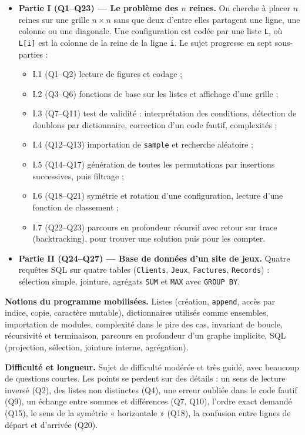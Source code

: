 \documentclass[11pt,a4paper]{article}
\providecommand{\tightlist}{\setlength{\itemsep}{0pt}\setlength{\parskip}{0pt}}
\begin{document}
\begin{itemize}
\tightlist
\item
  \textbf{Partie I (Q1--Q23) --- Le problème des \(n\) reines.} On cherche à placer \(n\) reines sur une grille \(n \times n\) sans que deux d'entre elles partagent une ligne, une colonne ou une diagonale. Une configuration est codée par une liste \texttt{L}, où \texttt{L{[}i{]}} est la colonne de la reine de la ligne \texttt{i}. Le sujet progresse en sept sous-parties :

  \begin{itemize}
  \tightlist
  \item
    I.1 (Q1--Q2) lecture de figures et codage ;
  \item
    I.2 (Q3--Q6) fonctions de base sur les listes et affichage d'une grille ;
  \item
    I.3 (Q7--Q11) test de validité : interprétation des conditions, détection de doublons par dictionnaire, correction d'un code fautif, complexités ;
  \item
    I.4 (Q12--Q13) importation de \texttt{sample} et recherche aléatoire ;
  \item
    I.5 (Q14--Q17) génération de toutes les permutations par insertions successives, puis filtrage ;
  \item
    I.6 (Q18--Q21) symétrie et rotation d'une configuration, lecture d'une fonction de classement ;
  \item
    I.7 (Q22--Q23) parcours en profondeur récursif avec retour sur trace (backtracking), pour trouver une solution puis pour les compter.
  \end{itemize}
\item
  \textbf{Partie II (Q24--Q27) --- Base de données d'un site de jeux.} Quatre requêtes SQL sur quatre tables (\texttt{Clients}, \texttt{Jeux}, \texttt{Factures}, \texttt{Records}) : sélection simple, jointure, agrégats \texttt{SUM} et \texttt{MAX} avec \texttt{GROUP\ BY}.
\end{itemize}

\textbf{Notions du programme mobilisées.} Listes (création, \texttt{append}, accès par indice, copie, caractère mutable), dictionnaires utilisés comme ensembles, importation de modules, complexité dans le pire des cas, invariant de boucle, récursivité et terminaison, parcours en profondeur d'un graphe implicite, SQL (projection, sélection, jointure interne, agrégation).

\textbf{Difficulté et longueur.} Sujet de difficulté modérée et très guidé, avec beaucoup de questions courtes. Les points se perdent sur des détails : un sens de lecture inversé (Q2), des listes non distinctes (Q4), une erreur oubliée dans le code fautif (Q9), un échange entre sommes et différences (Q7, Q10), l'ordre exact demandé (Q15), le sens de la symétrie « horizontale » (Q18), la confusion entre lignes de départ et d'arrivée (Q20).
\end{document}
